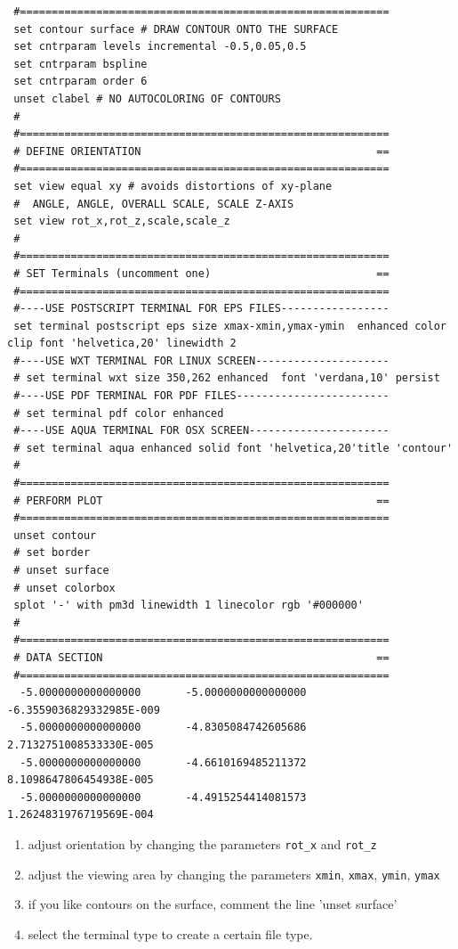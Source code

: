 \documentclass[final,12pt,makeidx,DIV=calc]{article}
\begin{document}
{{{{{{{\begin{verbatim}
 #==========================================================
 set contour surface # DRAW CONTOUR ONTO THE SURFACE
 set cntrparam levels incremental -0.5,0.05,0.5
 set cntrparam bspline
 set cntrparam order 6
 unset clabel # NO AUTOCOLORING OF CONTOURS
 #
 #==========================================================
 # DEFINE ORIENTATION                                     ==
 #==========================================================
 set view equal xy # avoids distortions of xy-plane
 #  ANGLE, ANGLE, OVERALL SCALE, SCALE Z-AXIS
 set view rot_x,rot_z,scale,scale_z
 #
 #==========================================================
 # SET Terminals (uncomment one)                          ==
 #==========================================================
 #----USE POSTSCRIPT TERMINAL FOR EPS FILES-----------------
 set terminal postscript eps size xmax-xmin,ymax-ymin  enhanced color clip font 'helvetica,20' linewidth 2 
 #----USE WXT TERMINAL FOR LINUX SCREEN---------------------
 # set terminal wxt size 350,262 enhanced  font 'verdana,10' persist 
 #----USE PDF TERMINAL FOR PDF FILES------------------------
 # set terminal pdf color enhanced 
 #----USE AQUA TERMINAL FOR OSX SCREEN----------------------
 # set terminal aqua enhanced solid font 'helvetica,20'title 'contour'
 #
 #==========================================================
 # PERFORM PLOT                                           ==
 #==========================================================
 unset contour
 # set border
 # unset surface
 # unset colorbox
 splot '-' with pm3d linewidth 1 linecolor rgb '#000000'
 #
 #==========================================================
 # DATA SECTION                                           ==
 #==========================================================
  -5.0000000000000000       -5.0000000000000000       -6.3559036829332985E-009
  -5.0000000000000000       -4.8305084742605686        2.7132751008533330E-005
  -5.0000000000000000       -4.6610169485211372        8.1098647806454938E-005
  -5.0000000000000000       -4.4915254414081573        1.2624831976719569E-004
\end{verbatim}}

\begin{enumerate}
\item adjust orientation by changing the parameters \verb|rot_x| and
  \verb|rot_z|
\item adjust the viewing area by changing the parameters \verb|xmin|,
  \verb|xmax|, \verb|ymin|, \verb|ymax|
\item if you like contours on the surface, comment the line 'unset surface'
\item select the terminal type to create a certain file type.
\end{enumerate}



}}}}}}
\end{document}
